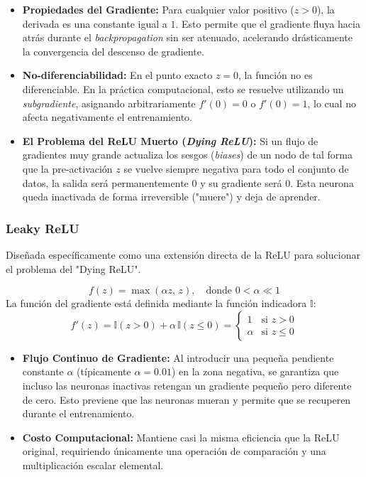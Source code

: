 \begin{itemize}
    \item \textbf{Propiedades del Gradiente:} Para cualquier valor positivo ($z > 0$), la derivada es una constante igual a $1$. Esto permite que el gradiente fluya hacia atrás durante el \textit{backpropagation} sin ser atenuado, acelerando drásticamente la convergencia del descenso de gradiente.
    \item \textbf{No-diferenciabilidad:} En el punto exacto $z = 0$, la función no es diferenciable. En la práctica computacional, esto se resuelve utilizando un \textit{subgradiente}, asignando arbitrariamente $f'(0) = 0$ o $f'(0) = 1$, lo cual no afecta negativamente el entrenamiento.
    \item \textbf{El Problema del ReLU Muerto (\textit{Dying ReLU}):} Si un flujo de gradientes muy grande actualiza los sesgos (\textit{biases}) de un nodo de tal forma que la pre-activación $z$ se vuelve siempre negativa para todo el conjunto de datos, la salida será permanentemente $0$ y su gradiente será $0$. Esta neurona queda inactivada de forma irreversible ("muere") y deja de aprender.
\end{itemize}

\subsubsection{Leaky ReLU}

Diseñada específicamente como una extensión directa de la ReLU para solucionar el problema del "Dying ReLU".

\begin{equation}
    f(z) = \max(\alpha z,\,z), \quad \text{donde } 0 < \alpha \ll 1 
\end{equation}
La función del gradiente está definida mediante la función indicadora $\mathbb{I}$:
\begin{equation}
    f'(z) = \mathbb{I}(z>0) + \alpha\,\mathbb{I}(z\le 0) = \begin{cases} 1 & \text{si } z > 0 \\ \alpha & \text{si } z \le 0 \end{cases}
\end{equation}

\begin{itemize}
    \item \textbf{Flujo Continuo de Gradiente:} Al introducir una pequeña pendiente constante $\alpha$ (típicamente $\alpha = 0.01$) en la zona negativa, se garantiza que incluso las neuronas inactivas retengan un gradiente pequeño pero diferente de cero. Esto previene que las neuronas mueran y permite que se recuperen durante el entrenamiento.
    \item \textbf{Costo Computacional:} Mantiene casi la misma eficiencia que la ReLU original, requiriendo únicamente una operación de comparación y una multiplicación escalar elemental.
\end{itemize}

